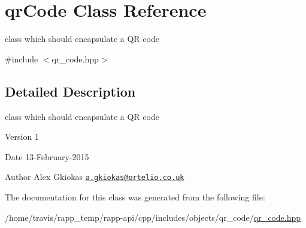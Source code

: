 \hypertarget{classqrCode}{\section{qr\-Code Class Reference}
\label{classqrCode}
}


class which should encapsulate a Q\-R code  




{\ttfamily \#include $<$qr\-\_\-code.\-hpp$>$}



\subsection{Detailed Description}
class which should encapsulate a Q\-R code 

\begin{DoxyVersion}{Version}
1 
\end{DoxyVersion}
\begin{DoxyDate}{Date}
13-\/\-February-\/2015 
\end{DoxyDate}
\begin{DoxyAuthor}{Author}
Alex Gkiokas \href{mailto:a.gkiokas@ortelio.co.uk}{\tt a.\-gkiokas@ortelio.\-co.\-uk} 
\end{DoxyAuthor}


The documentation for this class was generated from the following file\-:\begin{DoxyCompactItemize}
\item 
/home/travis/rapp\-\_\-temp/rapp-\/api/cpp/includes/objects/qr\-\_\-code/\hyperlink{qr__code_8hpp}{qr\-\_\-code.\-hpp}\end{DoxyCompactItemize}
